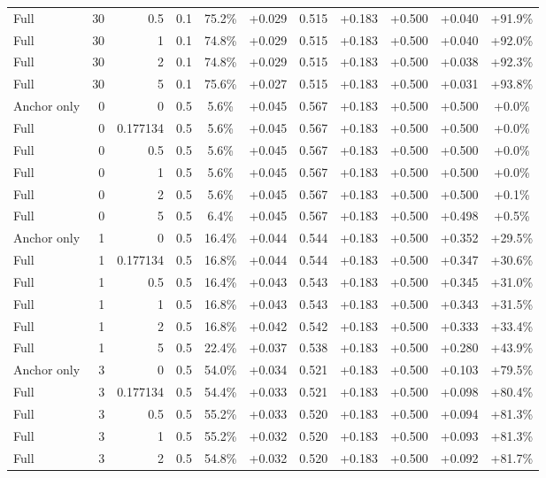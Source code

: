 \begin{table}[htbp]
\begin{tabular}{lrrrccccccc}
Full & 30 & 0.5 & 0.1 & 75.2\% & +0.029 & 0.515 & +0.183 & +0.500 & +0.040 & +91.9\% \\
Full & 30 & 1 & 0.1 & 74.8\% & +0.029 & 0.515 & +0.183 & +0.500 & +0.040 & +92.0\% \\
Full & 30 & 2 & 0.1 & 74.8\% & +0.029 & 0.515 & +0.183 & +0.500 & +0.038 & +92.3\% \\
Full & 30 & 5 & 0.1 & 75.6\% & +0.027 & 0.515 & +0.183 & +0.500 & +0.031 & +93.8\% \\
Anchor only & 0 & 0 & 0.5 & 5.6\% & +0.045 & 0.567 & +0.183 & +0.500 & +0.500 & +0.0\% \\
Full & 0 & 0.177134 & 0.5 & 5.6\% & +0.045 & 0.567 & +0.183 & +0.500 & +0.500 & +0.0\% \\
Full & 0 & 0.5 & 0.5 & 5.6\% & +0.045 & 0.567 & +0.183 & +0.500 & +0.500 & +0.0\% \\
Full & 0 & 1 & 0.5 & 5.6\% & +0.045 & 0.567 & +0.183 & +0.500 & +0.500 & +0.0\% \\
Full & 0 & 2 & 0.5 & 5.6\% & +0.045 & 0.567 & +0.183 & +0.500 & +0.500 & +0.1\% \\
Full & 0 & 5 & 0.5 & 6.4\% & +0.045 & 0.567 & +0.183 & +0.500 & +0.498 & +0.5\% \\
Anchor only & 1 & 0 & 0.5 & 16.4\% & +0.044 & 0.544 & +0.183 & +0.500 & +0.352 & +29.5\% \\
Full & 1 & 0.177134 & 0.5 & 16.8\% & +0.044 & 0.544 & +0.183 & +0.500 & +0.347 & +30.6\% \\
Full & 1 & 0.5 & 0.5 & 16.4\% & +0.043 & 0.543 & +0.183 & +0.500 & +0.345 & +31.0\% \\
Full & 1 & 1 & 0.5 & 16.8\% & +0.043 & 0.543 & +0.183 & +0.500 & +0.343 & +31.5\% \\
Full & 1 & 2 & 0.5 & 16.8\% & +0.042 & 0.542 & +0.183 & +0.500 & +0.333 & +33.4\% \\
Full & 1 & 5 & 0.5 & 22.4\% & +0.037 & 0.538 & +0.183 & +0.500 & +0.280 & +43.9\% \\
Anchor only & 3 & 0 & 0.5 & 54.0\% & +0.034 & 0.521 & +0.183 & +0.500 & +0.103 & +79.5\% \\
Full & 3 & 0.177134 & 0.5 & 54.4\% & +0.033 & 0.521 & +0.183 & +0.500 & +0.098 & +80.4\% \\
Full & 3 & 0.5 & 0.5 & 55.2\% & +0.033 & 0.520 & +0.183 & +0.500 & +0.094 & +81.3\% \\
Full & 3 & 1 & 0.5 & 55.2\% & +0.032 & 0.520 & +0.183 & +0.500 & +0.093 & +81.3\% \\
Full & 3 & 2 & 0.5 & 54.8\% & +0.032 & 0.520 & +0.183 & +0.500 & +0.092 & +81.7\% \\

\end{tabular}
\end{table}
